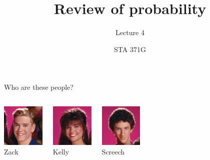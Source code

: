 \documentclass{beamer}\usepackage[]{graphicx}\usepackage[]{color}
\title{Review of probability}
\subtitle{Lecture 4}
\author{STA 371G}
\begin{document}
  
  

  \frame{\maketitle}



  \begin{darkframes}

    \begin{frame}{Who are these people?}
      \begin{columns}[onlytextwidth]
          \begin{center}
            \includegraphics[width=0.8in]{zack} \\
            Zack
          \end{center}
          \begin{center}
            \includegraphics[width=0.8in]{kelly} \\
            Kelly
          \end{center}
          \begin{center}
            \includegraphics[width=0.8in]{screech} \\
            Screech
          \end{center}
      \end{columns}
      \smallskip
      \begin{columns}[onlytextwidth]

\end{columns}
\end{frame}
\end{darkframes}
\end{document}
